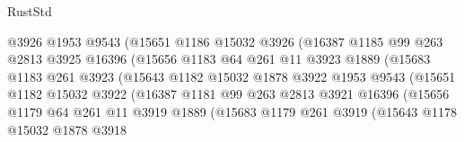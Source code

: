 \begin{lexlean}{RustStd}
\begin{coremodule}
                            @3926
                            @1953
                            @9543
                            (@15651
                              @1186
                              @15032
                              @3926
                              (@16387
                                @1185
                                @99
                                @263
                                @2813
                                @3925
                                @16396
                                (@15656
                                  @1183
                                  @64
                                  @261
                                  @11
                                  @3923
                                  @1889
                                  (@15683
                                    @1183
                                    @261
                                    @3923
                                    (@15643
                                      @1182
                                      @15032
                                      @1878
                                      @3922
                                      @1953
                                      @9543
                                      (@15651
                                        @1182
                                        @15032
                                        @3922
                                        (@16387
                                          @1181
                                          @99
                                          @263
                                          @2813
                                          @3921
                                          @16396
                                          (@15656
                                            @1179
                                            @64
                                            @261
                                            @11
                                            @3919
                                            @1889
                                            (@15683
                                              @1179
                                              @261
                                              @3919
                                              (@15643
                                                @1178
                                                @15032
                                                @1878
                                                @3918

\end{coremodule}
\end{lexlean}
